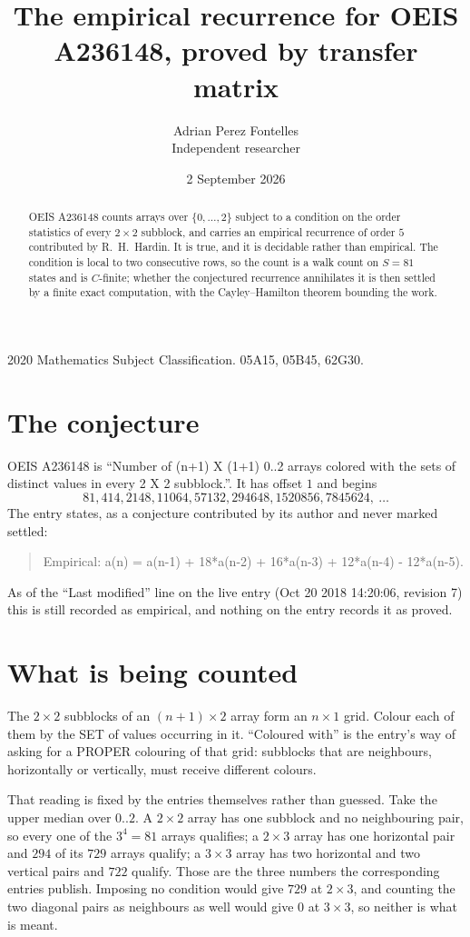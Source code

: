 \documentclass[11pt,a4paper]{article}
\title{The empirical recurrence for OEIS A236148, proved by transfer matrix}
\author{Adrian Perez Fontelles\\ \small Independent researcher}
\date{2 September 2026}
\theoremstyle{plain}
\theoremstyle{definition}
\begin{document}
\maketitle

\begin{abstract}
OEIS A236148 counts arrays over $\{0,\dots,2\}$ subject to a condition on the order
statistics of every $2\times2$ subblock, and carries an empirical recurrence of order
$5$ contributed by R.~H.~Hardin. It is true, and it is decidable rather than empirical.
The condition is local to two consecutive rows, so the count is a walk count on $S=81$
states and is $C$-finite; whether the conjectured recurrence annihilates it is then settled by
a finite exact computation, with the Cayley--Hamilton theorem bounding the work.
\end{abstract}

\noindent\small 2020 Mathematics Subject Classification. 05A15, 05B45, 62G30.\normalsize

\section{The conjecture}

OEIS A236148 is ``Number of (n+1) X (1+1) 0..2 arrays colored with the sets of distinct values in every 2 X 2 subblock.''. It has offset $1$ and begins
\[
81, 414, 2148, 11064, 57132, 294648, 1520856, 7845624,\ \dots
\]
The entry states, as a conjecture contributed by its author and never marked settled:
\begin{quote}
Empirical: a(n) = a(n-1) + 18*a(n-2) + 16*a(n-3) + 12*a(n-4) - 12*a(n-5).
\end{quote}
As of the ``Last modified'' line on the live entry (Oct 20 2018 14:20:06, revision 7) this is still
recorded as empirical, and nothing on the entry records it as proved.

\section{What is being counted}

The $2\times2$ subblocks of an $(n+1)\times2$ array form an
$n\times1$ grid. Colour each of them by the SET of values occurring in it. ``Coloured with'' is the entry's way of
asking for a PROPER colouring of that grid: subblocks that are neighbours, horizontally or
vertically, must receive different colours.

That reading is fixed by the entries themselves rather than guessed. Take the upper median
over $0..2$. A $2\times2$ array has one subblock and no neighbouring pair, so every one of the
$3^4=81$ arrays qualifies; a $2\times3$ array has one horizontal pair and $294$ of its $729$
arrays qualify; a $3\times3$ array has two horizontal and two vertical pairs and $722$
qualify. Those are the three numbers the corresponding entries publish. Imposing no condition
would give $729$ at $2\times3$, and counting the two diagonal pairs as neighbours as well
would give $0$ at $3\times3$, so neither is what is meant.
\end{document}
